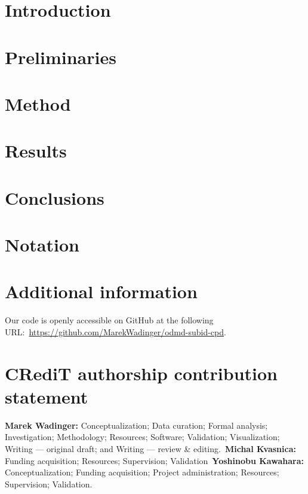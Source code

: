 \documentclass[preprint,12pt,authoryear]{elsarticle}
\begin{document}
\linenumbers{}

\section{Introduction}\label{sec:introduction}


\section{Preliminaries}\label{sec:preliminaries}


\clearpage
\section{Method}\label{sec:method}


\clearpage
\section{Results}\label{sec:results}


\section{Conclusions}\label{sec:conclusions}


\section*{Notation}


\section*{Additional information}
Our code is openly accessible on GitHub at the following URL:~\url{https://github.com/MarekWadinger/odmd-subid-cpd}.

\section*{CRediT authorship contribution statement}
\textbf{Marek Wadinger:} Conceptualization; Data curation; Formal analysis; Investigation; Methodology; Resources; Software; Validation; Visualization; Writing --- original draft; and Writing --- review \& editing.~\textbf{Michal Kvasnica:} Funding acquisition; Resources; Supervision; Validation~\textbf{Yoshinobu Kawahara:} Conceptualization; Funding acquisition; Project administration; Resources; Supervision; Validation.
\end{document}
